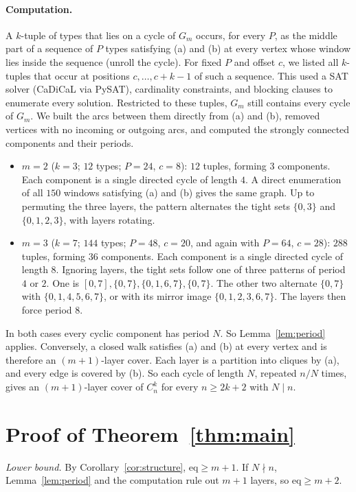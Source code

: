 \documentclass[11pt]{article}
\theoremstyle{remark}
\begin{document}
\paragraph{Computation.} A $k$-tuple of types that lies on a cycle of $G_m$ occurs, for every $P$, as the middle part of a sequence of $P$ types satisfying (a) and (b) at every vertex whose window lies inside the sequence (unroll the cycle). For fixed $P$ and offset $c$, we listed all $k$-tuples that occur at positions $c,\dots,c+k-1$ of such a sequence. This used a SAT solver (CaDiCaL via PySAT), cardinality constraints, and blocking clauses to enumerate every solution. Restricted to these tuples, $G_m$ still contains every cycle of $G_m$. We built the arcs between them directly from (a) and (b), removed vertices with no incoming or outgoing arcs, and computed the strongly connected components and their periods.
\begin{itemize}
\item $m=2$ ($k=3$; $12$ types; $P=24$, $c=8$): $12$ tuples, forming $3$ components. Each component is a single directed cycle of length $4$. A direct enumeration of all $150$ windows satisfying (a) and (b) gives the same graph. Up to permuting the three layers, the pattern alternates the tight sets $\{0,3\}$ and $\{0,1,2,3\}$, with layers rotating.
\item $m=3$ ($k=7$; $144$ types; $P=48$, $c=20$, and again with $P=64$, $c=28$): $288$ tuples, forming $36$ components. Each component is a single directed cycle of length $8$. Ignoring layers, the tight sets follow one of three patterns of period $4$ or $2$. One is $[0,7],\{0,7\},\{0,1,6,7\},\{0,7\}$. The other two alternate $\{0,7\}$ with $\{0,1,4,5,6,7\}$, or with its mirror image $\{0,1,2,3,6,7\}$. The layers then force period $8$.
\end{itemize}
In both cases every cyclic component has period $N$. So Lemma~\ref{lem:period} applies. Conversely, a closed walk satisfies (a) and (b) at every vertex and is therefore an $(m+1)$-layer cover. Each layer is a partition into cliques by (a), and every edge is covered by (b). So each cycle of length $N$, repeated $n/N$ times, gives an $(m+1)$-layer cover of $C_n^k$ for every $n\ge 2k+2$ with $N\mid n$.

\section{Proof of Theorem~\ref{thm:main}}\label{sec:proof}
\emph{Lower bound.} By Corollary~\ref{cor:structure}, $\mathrm{eq}\ge m+1$. If $N\nmid n$, Lemma~\ref{lem:period} and the computation rule out $m+1$ layers, so $\mathrm{eq}\ge m+2$.
\end{document}
